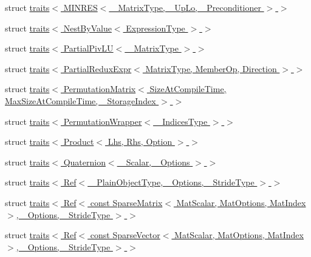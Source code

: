 \begin{DoxyCompactItemize}
struct \hyperlink{struct_eigen_1_1internal_1_1traits_3_01_m_i_n_r_e_s_3_01___matrix_type_00_01___up_lo_00_01___preconditioner_01_4_01_4}{traits$<$ M\+I\+N\+R\+E\+S$<$ \+\_\+\+Matrix\+Type, \+\_\+\+Up\+Lo, \+\_\+\+Preconditioner $>$ $>$}
\item 
struct \hyperlink{struct_eigen_1_1internal_1_1traits_3_01_nest_by_value_3_01_expression_type_01_4_01_4}{traits$<$ Nest\+By\+Value$<$ Expression\+Type $>$ $>$}
\item 
struct \hyperlink{struct_eigen_1_1internal_1_1traits_3_01_partial_piv_l_u_3_01___matrix_type_01_4_01_4}{traits$<$ Partial\+Piv\+L\+U$<$ \+\_\+\+Matrix\+Type $>$ $>$}
\item 
struct \hyperlink{struct_eigen_1_1internal_1_1traits_3_01_partial_redux_expr_3_01_matrix_type_00_01_member_op_00_01_direction_01_4_01_4}{traits$<$ Partial\+Redux\+Expr$<$ Matrix\+Type, Member\+Op, Direction $>$ $>$}
\item 
struct \hyperlink{struct_eigen_1_1internal_1_1traits_3_01_permutation_matrix_3_01_size_at_compile_time_00_01_max_sd0808d93099012556270f7c7cd36fcc5}{traits$<$ Permutation\+Matrix$<$ Size\+At\+Compile\+Time, Max\+Size\+At\+Compile\+Time, \+\_\+\+Storage\+Index $>$ $>$}
\item 
struct \hyperlink{struct_eigen_1_1internal_1_1traits_3_01_permutation_wrapper_3_01___indices_type_01_4_01_4}{traits$<$ Permutation\+Wrapper$<$ \+\_\+\+Indices\+Type $>$ $>$}
\item 
struct \hyperlink{struct_eigen_1_1internal_1_1traits_3_01_product_3_01_lhs_00_01_rhs_00_01_option_01_4_01_4}{traits$<$ Product$<$ Lhs, Rhs, Option $>$ $>$}
\item 
struct \hyperlink{struct_eigen_1_1internal_1_1traits_3_01_quaternion_3_01___scalar_00_01___options_01_4_01_4}{traits$<$ Quaternion$<$ \+\_\+\+Scalar, \+\_\+\+Options $>$ $>$}
\item 
struct \hyperlink{struct_eigen_1_1internal_1_1traits_3_01_ref_3_01___plain_object_type_00_01___options_00_01___stride_type_01_4_01_4}{traits$<$ Ref$<$ \+\_\+\+Plain\+Object\+Type, \+\_\+\+Options, \+\_\+\+Stride\+Type $>$ $>$}
\item 
struct \hyperlink{struct_eigen_1_1internal_1_1traits_3_01_ref_3_01const_01_sparse_matrix_3_01_mat_scalar_00_01_mat06d17b3f87cceb06f00332b993332271}{traits$<$ Ref$<$ const Sparse\+Matrix$<$ Mat\+Scalar, Mat\+Options, Mat\+Index $>$, \+\_\+\+Options, \+\_\+\+Stride\+Type $>$ $>$}
\item 
struct \hyperlink{struct_eigen_1_1internal_1_1traits_3_01_ref_3_01const_01_sparse_vector_3_01_mat_scalar_00_01_mat15c4780d000a619e80140ca70456913a}{traits$<$ Ref$<$ const Sparse\+Vector$<$ Mat\+Scalar, Mat\+Options, Mat\+Index $>$, \+\_\+\+Options, \+\_\+\+Stride\+Type $>$ $>$}

\end{DoxyCompactItemize}
